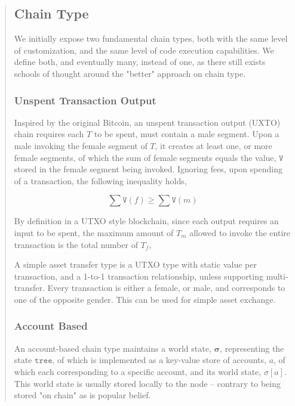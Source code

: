 \documentclass[12pt, titlepage, twocolumn]{report}
\begin{document}
\begin{quotation}
\subsection{Chain Type} \label{chaintypes}
We initially expose two fundamental chain types, both with the same level of customization, and the same level of code execution capabilities. We define both, and eventually many, instead of one, as there still exists schools of thought around the "better" approach on chain type.


\subsubsection{Unspent Transaction Output}
Inspired by the original Bitcoin, an unspent transaction output (UXTO) chain requires each \(T\) to be spent, must contain a male segment. Upon a male invoking the female segment of \(T\), it creates at least one, or more female segments, of which the sum of female segments equals the value, \(\boldsymbol{\texttt{V}}\) stored in the female segment being invoked. Ignoring fees, upon spending of a transaction, the following inequality holds,

\begin{equation}
	 \sum \boldsymbol{\texttt{V}}(f) \geq \sum \boldsymbol{\texttt{V}}(m)
\end{equation} 

By definition in a UTXO style blockchain, since each output requires an input to be spent, the maximum amount of \(T_m\) allowed to invoke the entire transaction is the total number of \(T_f\), 

A simple asset transfer type is a UTXO type with static value per transaction, and a 1-to-1 transaction relationship, unless supporting multi-transfer. Every transaction is either a female, or male, and corresponds to one of the opposite gender. This can be used for simple asset exchange.

\subsubsection{Account Based}
An account-based chain type maintains a world state, \( \boldsymbol{\sigma} \), representing the state \(\texttt{tree}\), of which is implemented as a key-value store of accounts, \(a\), of which each corresponding to a specific account, and its world state, \( \sigma [a] \). This world state is usually stored locally to the node -- contrary to being stored "on chain" as is popular belief.


\end{quotation}
\end{document}

